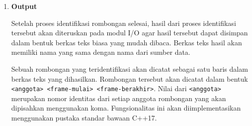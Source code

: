 \begin{enumerate}
    \fi
    
    \item \textbf{Output}
    
    Setelah proses identifikasi rombongan selesai, hasil dari proses identifikasi tersebut akan diteruskan pada modul I/O agar hasil tersebut dapat disimpan dalam bentuk berkas teks biasa yang mudah dibaca. Berkas teks hasil akan memiliki nama yang sama dengan nama dari sumber data. 
    
    Sebuah rombongan yang teridentifikasi akan dicatat sebagai satu baris dalam berkas teks yang dihasilkan. Rombongan tersebut akan dicatat dalam bentuk \texttt{<anggota> <frame-mulai> <frame-berakhir>}. Nilai dari \texttt{<anggota>} merupakan nomor identitas dari setiap anggota rombongan yang akan dipisahkan menggunakan koma. Fungsionalitas ini akan diimplementasikan menggunakan pustaka standar bawaan C++17.
\end{enumerate}
